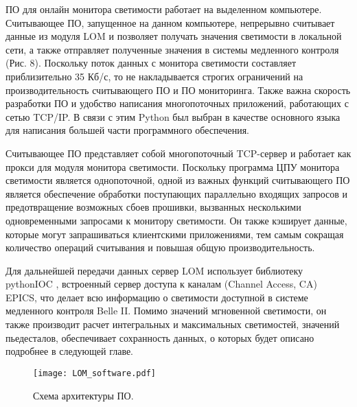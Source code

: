   ПО для онлайн монитора светимости работает на выделенном компьютере. Считывающее ПО, запущенное на данном компьютере, непрерывно считывает данные из модуля LOM и позволяет получать значения светимости в локальной сети, а также отправляет полученные значения в системы медленного контроля (Рис. 8). Поскольку поток данных с монитора светимости составляет приблизительно 35 Кб/с, то не накладывается строгих ограничений на производительность считывающего ПО и ПО мониторинга. Также важна скорость разработки ПО и удобство написания многопоточных приложений, работающих с сетью TCP/IP. В связи с этим Python был выбран в качестве основного языка для написания большей части программного обеспечения.\par
  Считывающее ПО представляет собой многопоточный TCP-сервер и работает как прокси для модуля монитора светимости. Поскольку программа ЦПУ монитора светимости является однопоточной, одной из важных функций считывающего ПО является обеспечение обработки поступающих параллельно входящих запросов и предотвращение возможных сбоев прошивки, вызванных несколькими одновременными запросами к монитору светимости. Он также кэширует данные, которые могут запрашиваться клиентскими приложениями, тем самым сокращая количество операций считывания и повышая общую производительность.\par
  Для дальнейшей передачи данных сервер LOM использует библиотеку pythonIOC \cite{PythonIoc}, встроенный сервер доступа к каналам (Channel Access, CA) EPICS, что делает всю информацию о светимости доступной в системе медленного контроля Belle II. Помимо значений мгновенной светимости, он также производит расчет интегральных и максимальных светимостей, значений пьедесталов, обеспечивает сохранность данных, о которых будет описано подробнее в следующей главе.
\begin{figure}[htp]
  \centering
  \texttt{[image: LOM\_software.pdf]}
  \caption{Схема архитектуры ПО.}
  \label{fig:galaxy}
\end{figure}
